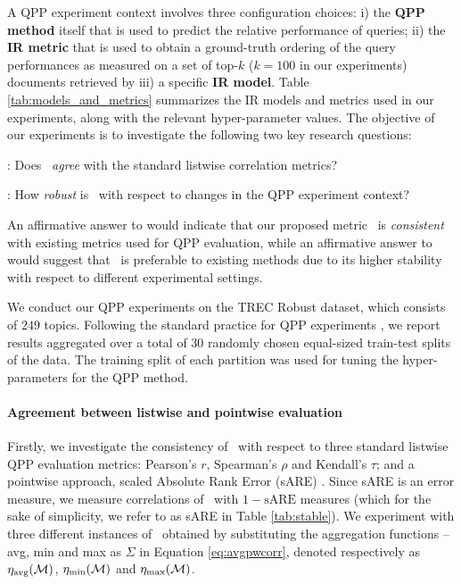 \label{sec:exp}


A QPP experiment context \cite{dg22ecir} involves three configuration choices: i) the \textbf{QPP method} itself that is used to predict the relative performance of queries; ii) the \textbf{IR metric} that is used to obtain a ground-truth ordering of the query performances as measured on a set of top-$k$ ($k=100$ in our experiments) documents retrieved by iii) a specific \textbf{IR model}. Table \ref{tab:models_and_metrics} summarizes the IR models and metrics used in our experiments, along with the relevant hyper-parameter values. The objective of our experiments is to investigate the following two key research questions:

\begin{compactitem}
    \item {}: Does \proposed~\textit{agree} with the standard listwise correlation metrics?
    \item {}: How \textit{robust} is \proposed~with respect to changes in the QPP experiment context?
\end{compactitem}


An affirmative answer to  would indicate that our proposed metric \proposed~is \textit{consistent} with existing metrics used for QPP evaluation, while an affirmative answer to  would suggest that \proposed~is preferable to existing methods due to its higher stability with respect to different experimental settings.



We conduct our QPP experiments on the TREC Robust dataset, which consists of $249$ topics. Following the standard practice for QPP experiments \cite{hamed_neuralqpp,query_variants_kurland}, we report results aggregated over a total of 30 randomly chosen equal-sized train-test splits of the data. The training split of each partition was used for tuning the hyper-parameters for the QPP method.

\paragraph{Agreement between listwise and pointwise evaluation}
Firstly, we investigate the consistency of \proposed~with respect to three standard listwise QPP evaluation metrics: Pearson's $r$, Spearman's $\rho$ and Kendall's $\tau$; and a pointwise approach, scaled Absolute Rank Error (sARE) \cite{sare}. Since sARE is an error measure, we measure correlations of \proposed~with $1-\text{sARE}$ measures (which for the sake of simplicity, we refer to as sARE in Table \ref{tab:stable}). We experiment with three different instances of \proposed~obtained by substituting the aggregation functions -- avg, min and max as $\Sigma$ in Equation \ref{eq:avgpwcorr}, denoted respectively as $\eta_\text{avg}(\mathcal{M})$, $\eta_\text{min}(\mathcal{M})$ and $\eta_\text{max}(\mathcal{M})$.

